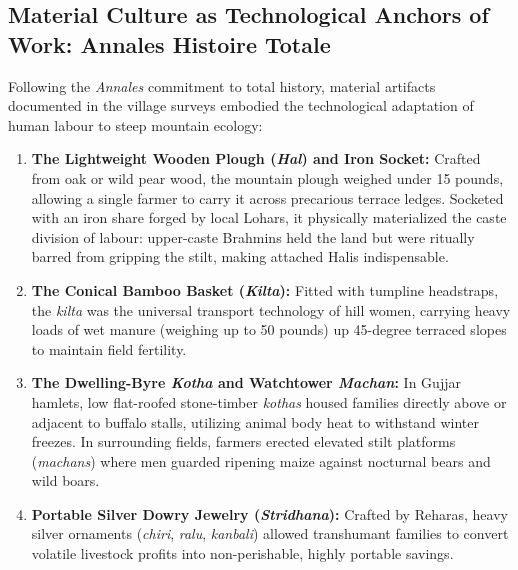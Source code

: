 \documentclass[11pt,a4paper]{article}
\begin{document}
\subsection{Material Culture as Technological Anchors of Work: Annales Histoire Totale}
Following the \textit{Annales} commitment to total history, material artifacts documented in the village surveys embodied the technological adaptation of human labour to steep mountain ecology:
\begin{enumerate}[leftmargin=*]
    \item \textbf{The Lightweight Wooden Plough (\textit{Hal}) and Iron Socket:} Crafted from oak or wild pear wood, the mountain plough weighed under 15 pounds, allowing a single farmer to carry it across precarious terrace ledges. Socketed with an iron share forged by local Lohars, it physically materialized the caste division of labour: upper-caste Brahmins held the land but were ritually barred from gripping the stilt, making attached Halis indispensable.
    \item \textbf{The Conical Bamboo Basket (\textit{Kilta}):} Fitted with tumpline headstraps, the \textit{kilta} was the universal transport technology of hill women, carrying heavy loads of wet manure (weighing up to 50 pounds) up 45-degree terraced slopes to maintain field fertility.
    \item \textbf{The Dwelling-Byre \textit{Kotha} and Watchtower \textit{Machan}:} In Gujjar hamlets, low flat-roofed stone-timber \textit{kothas} housed families directly above or adjacent to buffalo stalls, utilizing animal body heat to withstand winter freezes. In surrounding fields, farmers erected elevated stilt platforms (\textit{machans}) where men guarded ripening maize against nocturnal bears and wild boars.
    \item \textbf{Portable Silver Dowry Jewelry (\textit{Stridhana}):} Crafted by Reharas, heavy silver ornaments (\textit{chiri}, \textit{ralu}, \textit{kanbali}) allowed transhumant families to convert volatile livestock profits into non-perishable, highly portable savings.
\end{enumerate}
\end{document}
